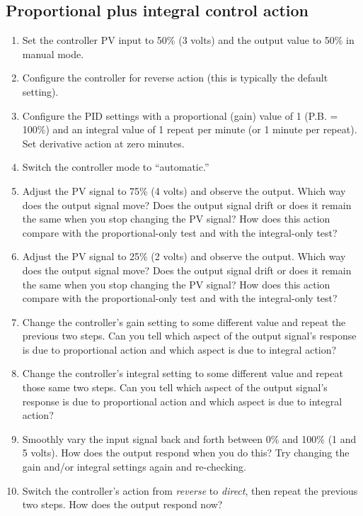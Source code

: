 \filbreak
\subsection{Proportional plus integral control action}

\begin{enumerate}
\item Set the controller PV input to 50\% (3 volts) and the output value to 50\% in manual mode.
\item Configure the controller for reverse action (this is typically the default setting).
\item Configure the PID settings with a proportional (gain) value of 1 (P.B. = 100\%) and an integral value of 1 repeat per minute (or 1 minute per repeat).  Set derivative action at zero minutes.
\item Switch the controller mode to ``automatic.''
\item Adjust the PV signal to 75\% (4 volts) and observe the output.  Which way does the output signal move?  Does the output signal drift or does it remain the same when you stop changing the PV signal?  How does this action compare with the proportional-only test and with the integral-only test?
\item Adjust the PV signal to 25\% (2 volts) and observe the output.  Which way does the output signal move?  Does the output signal drift or does it remain the same when you stop changing the PV signal?  How does this action compare with the proportional-only test and with the integral-only test?
\item Change the controller's gain setting to some different value and repeat the previous two steps.  Can you tell which aspect of the output signal's response is due to proportional action and which aspect is due to integral action?
\item Change the controller's integral setting to some different value and repeat those same two steps.  Can you tell which aspect of the output signal's response is due to proportional action and which aspect is due to integral action?
\item Smoothly vary the input signal back and forth between 0\% and 100\% (1 and 5 volts).  How does the output respond when you do this?  Try changing the gain and/or integral settings again and re-checking.
\item Switch the controller's action from \textit{reverse} to \textit{direct}, then repeat the previous two steps.  How does the output respond now?
\end{enumerate}







